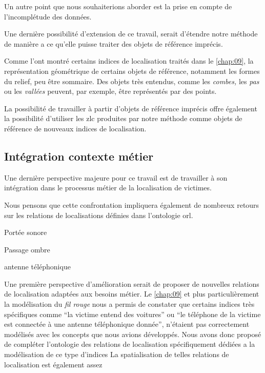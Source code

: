 Un autre point que nous souhaiterions aborder est la prise en compte
de l'incomplétude des données.

Une dernière possibilité d'extension de ce travail, serait d'étendre
notre méthode de manière a ce qu'elle puisse traiter des objets de
référence imprécis.

Comme l'ont montré certains indices de localisation traités dans le
\autoref{chap:09}, la représentation géométrique de certains objets de
référence, notamment les formes du relief, peu être sommaire. Des
objets très entendus, comme les \emph{combes,} les \emph{pas} ou les
\emph{vallées} peuvent, par exemple, être représentés par des points.


La possibilité de travailler à partir d'objets de référence imprécis
offre également la possibilité d'utiliser les \ac{zlc} produites par
notre méthode comme objets de référence de nouveaux indices de
localisation.

\subsection*{Intégration contexte métier}

Une dernière perspective majeure pour ce travail est de travailler à
son intégration dans le processus métier de la localisation de victimes.




Nous pensons que cette confrontation impliquera également de nombreux
retours sur les relations de localisations définies dans l'ontologie
\ac{orl}.

Portée sonore

Passage ombre

antenne téléphonique

Une première perspective d'amélioration serait de proposer de
nouvelles relations de localisation adaptées aux besoins métier. Le
\autoref{chap:09} et plus particulièrement la modélisation du
\emph{fil rouge} nous a permis de constater que certains indices très
spécifiques comme \enquote{la victime entend des voitures} ou
\enquote{le téléphone de la victime est connectée à une antenne
  téléphonique donnée}, n'étaient pas correctement modélisés avec les
concepts que nous avions développés.
%
Nous avons donc proposé de compléter l'ontologie des relations de
localisation spécifiquement dédiées a la modélisation de ce type
d'indices
%
La spatialisation de telles relations de localisation est également
assez 


